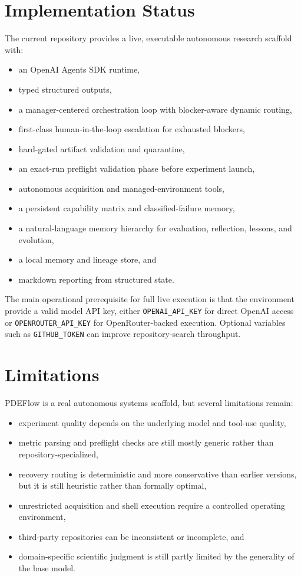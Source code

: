 \documentclass[11pt]{article}
\begin{document}
\section{Implementation Status}
The current repository provides a live, executable autonomous research scaffold with:
\begin{itemize}[leftmargin=1.5em]
  \item an OpenAI Agents SDK runtime,
  \item typed structured outputs,
  \item a manager-centered orchestration loop with blocker-aware dynamic routing,
  \item first-class human-in-the-loop escalation for exhausted blockers,
  \item hard-gated artifact validation and quarantine,
  \item an exact-run preflight validation phase before experiment launch,
  \item autonomous acquisition and managed-environment tools,
  \item a persistent capability matrix and classified-failure memory,
  \item a natural-language memory hierarchy for evaluation, reflection, lessons, and evolution,
  \item a local memory and lineage store, and
  \item markdown reporting from structured state.
\end{itemize}

The main operational prerequisite for full live execution is that the environment provide a valid model API key, either \texttt{OPENAI\_API\_KEY} for direct OpenAI access or \texttt{OPENROUTER\_API\_KEY} for OpenRouter-backed execution. Optional variables such as \texttt{GITHUB\_TOKEN} can improve repository-search throughput.

\section{Limitations}
PDEFlow is a real autonomous systems scaffold, but several limitations remain:
\begin{itemize}[leftmargin=1.5em]
  \item experiment quality depends on the underlying model and tool-use quality,
  \item metric parsing and preflight checks are still mostly generic rather than repository-specialized,
  \item recovery routing is deterministic and more conservative than earlier versions, but it is still heuristic rather than formally optimal,
  \item unrestricted acquisition and shell execution require a controlled operating environment,
  \item third-party repositories can be inconsistent or incomplete, and
  \item domain-specific scientific judgment is still partly limited by the generality of the base model.
\end{itemize}
\end{document}
